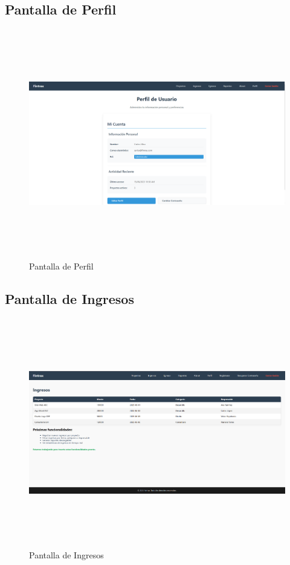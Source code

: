\subsection{Pantalla de Perfil}
\begin{figure}[H]
    \centering
    \includegraphics[width=15cm, height=10cm]{Archivos/Capturas/perfil.png}
    \caption{Pantalla de Perfil}
    \label{fig:perfil}
\end{figure}

\subsection{Pantalla de Ingresos}
\begin{figure}[H]
    \centering
    \includegraphics[width=15cm, height=10cm]{Archivos/Capturas/Ingresos.png}
    \caption{Pantalla de Ingresos}
    \label{fig:ingresos}
\end{figure}

